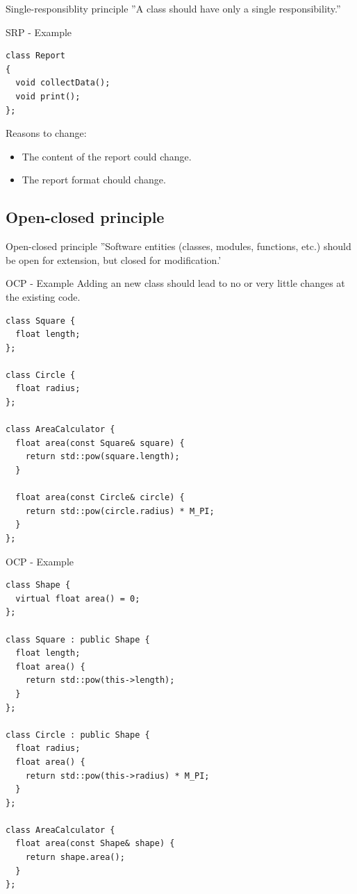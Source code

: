 \documentclass{beamer}
\begin{document}
\begin{frame}[fragile]{Single-responsiblity principle}
''A class should have only a single responsibility.''
\end{frame}

\begin{frame}[fragile]{SRP - Example}
\begin{lstlisting}[caption=SRP Anti-Example]
class Report
{
  void collectData();
  void print();
};
\end{lstlisting}

\begin{block}{Reasons to change:}
\begin{itemize}
  \item The content of the report could change.
  \item The report format chould change.
\end{itemize}
\end{block}
\end{frame}


\subsection{Open-closed principle}

\begin{frame}{Open-closed principle}
''Software entities (classes, modules, functions, etc.) should be open for
extension, but closed for modification.'
\end{frame}

\begin{frame}[fragile]{OCP - Example}
Adding an new class should lead to no or very little changes at the existing
code.

\begin{lstlisting}[caption=OCP Anti-Example]
class Square {
  float length;
};

class Circle {
  float radius;
};

class AreaCalculator {
  float area(const Square& square) {
    return std::pow(square.length);
  }
  
  float area(const Circle& circle) {
    return std::pow(circle.radius) * M_PI;
  }
};
\end{lstlisting}
\end{frame}

\begin{frame}[fragile]{OCP - Example}
\begin{lstlisting}[caption=OCP Example]
class Shape {
  virtual float area() = 0;
};

class Square : public Shape {
  float length;
  float area() {
    return std::pow(this->length);
  }
};

class Circle : public Shape {
  float radius;
  float area() {
    return std::pow(this->radius) * M_PI;
  }
};

class AreaCalculator {
  float area(const Shape& shape) {
    return shape.area();
  }
};
\end{lstlisting}
\end{frame}
\end{document}
